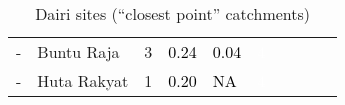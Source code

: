 \begin{table}[ht]
\begin{tabular}{C{0.05\textwidth}C{0.15\textwidth}C{0.08\textwidth}C{0.08\textwidth}C{0.08\textwidth}C{0.08\textwidth}C{0.08\textwidth}C{0.08\textwidth}C{0.08\textwidth}C{0.08\textwidth}}
  {-} & Buntu Raja &   3 & \textcolor[HTML]{000000}{0.24} & \textcolor[HTML]{000000}{0.04} & \textcolor[HTML]{FFFFFF}{4} &  &  &  &  \\ 
  {-} & Huta Rakyat &   1 & \textcolor[HTML]{000000}{0.20} & \textcolor[HTML]{000000}{  NA} & \textcolor[HTML]{FFFFFF}{4} &  &  &  &  \\ 
  \end{tabular}
\endgroup
\caption{Dairi sites (``closest point'' catchments)} 
\end{table}
